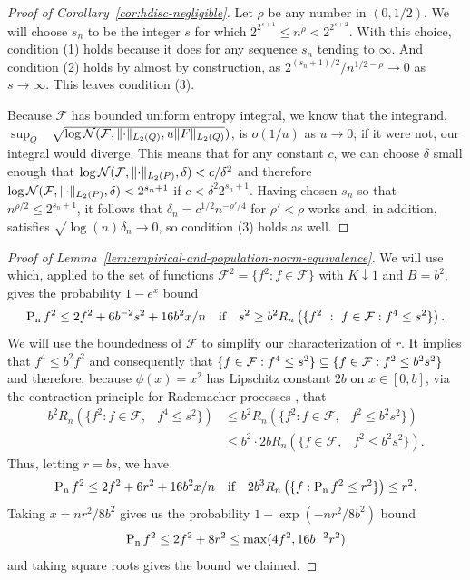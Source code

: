 \documentclass{article}
\DeclarePairedDelimiter\norm{\lVert}{\rVert}
\theoremstyle{definition}
\newcommand{\calF}{\ensuremath{\mathcal{F}}}
\newcommand{\calN}{\ensuremath{\mathcal{N}}}
\newcommand{\qif}{\quad \text{if} \quad}
\newcommand{\F}{\ensuremath{\mathcal{F}}}
\let\P\relax
\DeclareMathOperator{\Pn}{P_n}
\DeclareMathOperator{\P}{P}
\newcommand{\<}{\langle}
\renewcommand{\>}{\rangle}
\begin{document}
\begin{refsection}
\begin{proof}[Proof of Corollary~\ref{cor:hdisc-negligible}]
Let $\rho$ be any number in $(0,1/2)$.
We will choose $s_n$ to be the integer $s$ for which $2^{2^{s+1}} \le n^{\rho} < 2^{2^{s+2}}$. With this choice, condition (1) holds because it does for any sequence $s_n$ tending to $\infty$. And
condition (2) holds by almost by construction, as $2^{(s_n+1)/2} / n^{1/2-\rho} \to 0$ as $s \to \infty$. This leaves condition (3).

Because $\F$ has bounded uniform entropy integral, we know that the integrand,
$\sup_{Q}$ \ $\sqrt{\log\calN(\calF, \norm{\cdot}_{L_2(Q)}, u\norm{F}_{L_2(Q)}})$, is $o(1/u)$ as $u \to 0$; if it were not, our integral would diverge. This means that for any constant $c$, we can choose $\delta$ small enough that $\log\calN(\calF, \norm{\cdot}_{L_2(P)}, \delta) < c/\delta^2$ and therefore $\log\calN(\calF, \norm{\cdot}_{L_2(P)}, \delta) < 2^{s_n+1}$ if
$c < \delta^2 2^{s_n+1}$. Having chosen $s_n$ so that $n^{\rho/2} \le 2^{s_n+1}$, it follows that $\delta_n = c^{1/2}n^{-\rho'/4}$ for $\rho' < \rho$ works and, in addition, satisfies $\sqrt{\log(n)}\delta_n \to 0$, so condition (3) holds as well.
\end{proof}


\begin{proof}[Proof of Lemma~\ref{lem:empirical-and-population-norm-equivalence}]
We will use \citet[Theorem 3.3]{bartlett2005local} which, applied to the set of functions $\F^2=\{f^2 : f \in \F \}$ with $K \downarrow 1$ and $B=b^2$, gives the probability  $1-e^x$ bound
$$
\Pn f^2 \le 2\P f^2 + 6b^{-2} s^2 + 16b^2x/n \qif s^2 \ge b^2R_n\left(\{f^2  \ : \ f \in \F : \P f^4 \le s^2\}\right).
$$
We will use the boundedness of $\F$ to simplify our characterization of $r$. It implies that $f^4 \le b^2f^2$
and consequently that $\{f \in \F : \P f^4 \le s^2\} \subseteq \{f \in \F : \P f^2 \le b^2s^2\}$ and
therefore, because $\phi(x)=x^2$ has Lipschitz constant $2b$ on $x \in [0,b]$, via the contraction principle for Rademacher processes \citep[e.g.][Theorem A.6]{bartlett2005local}, that
$$
\begin{aligned}
b^2 R_n \left( \{f^2 : f \in \F, \ \Pn f^4 \le s^2\} \right)
&\le b^2 R_n \left(\{f^2 : f \in \F, \ \Pn f^2 \le b^2 s^2\}\right) \\
&\le b^2 \cdot 2b R_n \left(\{f \in \F, \ \Pn f^2 \le b^2 s^2\}\right).
\end{aligned}
$$
Thus, letting $r=b s$, we have
$$
\Pn f^2 \le 2\P f^2 + 6r^2+ 16b^2x/n \qif 2b^3 R_n\left( \{ f : \Pn f^2 \le r^2\} \right) \le r^2.
$$
Taking $x=nr^2/8b^2$ gives us the probability $1-\exp(-nr^2/8b^2)$ bound
$$
\Pn f^2 \le 2\P f^2 + 8 r^2 \le \max(4\P f^2, 16b^{-2}r^2)
$$
and taking square roots gives the bound we claimed.
\end{proof}



\end{refsection}
\end{document}
